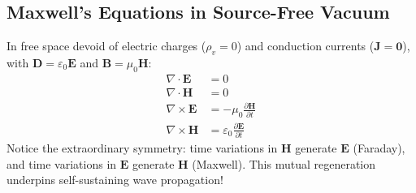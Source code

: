 \subsection{Maxwell's Equations in Source-Free Vacuum}
In free space devoid of electric charges ($\rho_v = 0$) and conduction currents ($\mathbf{J} = \mathbf{0}$), with $\mathbf{D} = \varepsilon_0 \mathbf{E}$ and $\mathbf{B} = \mu_0 \mathbf{H}$:
\begin{align}
    \nabla \cdot \mathbf{E} &= 0 \\
    \nabla \cdot \mathbf{H} &= 0 \\
    \nabla \times \mathbf{E} &= -\mu_0 \frac{\partial \mathbf{H}}{\partial t} \\
    \nabla \times \mathbf{H} &= \varepsilon_0 \frac{\partial \mathbf{E}}{\partial t}
\end{align}
Notice the extraordinary symmetry: time variations in $\mathbf{H}$ generate $\mathbf{E}$ (Faraday), and time variations in $\mathbf{E}$ generate $\mathbf{H}$ (Maxwell). This mutual regeneration underpins self-sustaining wave propagation!

